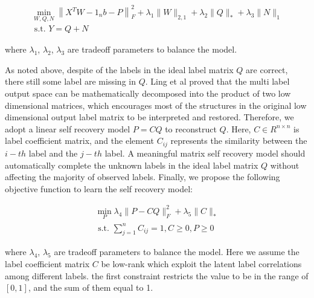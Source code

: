 \documentclass[final,3p,times]{elsarticle}
\begin{document}
\begin{equation}
	\begin{array}{l}
		\min _{W,Q,N}\left\|X^{T} W-1_{n} b-P\right\|_{F}^{2}+\lambda_{1}\|W\|_{2,1}+\lambda_{2}\|Q\|_{*}+\lambda_{3}\|N\|_{1} \\
		\text { s.t. } Y=Q+N
	\end{array}
\end{equation}

\noindent where $\lambda_{1}$, $\lambda_{2}$, $\lambda_{3}$ are tradeoff parameters to balance the model.

As noted above, despite of the labels in the ideal label matrix $Q$ are correct, there still some label are missing in $Q$. Ling et al \cite{ling2016} proved that the multi label output space can be mathematically decomposed into the product of two low dimensional matrices, which encourages most of the structures in the original low dimensional output label matrix to be interpreted and restored. Therefore, we adopt a linear self recovery model $P=CQ$ to reconstruct $Q$. Here, $C \in R^{n \times n}$ is label coefficient matrix, and the element $C_{ij}$ represents the similarity between the $i-th$ label and the $j-th$ label. A meaningful matrix self recovery model should automatically complete the unknown labels in the ideal label matrix $Q$ without affecting the majority of observed labels. Finally, we propose the following objective function to learn the self recovery model:

\begin{equation}
\begin{array}{l}
	\min _{P} \lambda_{4}\|P-C Q\|_{F}^{2}+\lambda_{5}\|C\|_{*} \\
	\text { s.t. } \sum_{j=1}^{n} C_{i j}=1, C \geq 0, P \geq 0
\end{array}
\end{equation}

\noindent where $\lambda_{4}$, $\lambda_{5}$ are tradeoff parameters to balance the model. Here we assume the label coefficient matrix $C$ be low-rank which exploit the latent label correlations among different labels. the first constraint restricts the value to be in the range of $[0,1]$, and the sum of them equal to 1.
\end{document}
